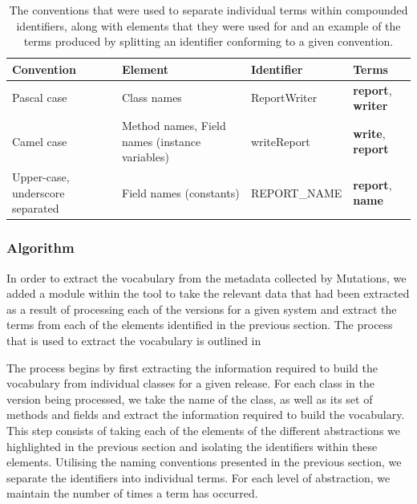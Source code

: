 \begin{table}[t]
\centering
\begin{tabular}{|p{}|p{}|p{}|p{}|}
\hline
{\bf Convention}&{\bf Element}&{\bf Identifier}&{\bf Terms} \\
\hline
\hline
Pascal case & Class names & ReportWriter & \textbf{report}, \textbf{writer} \\
\hline
Camel case & Method names, Field names (instance variables) & writeReport & \textbf{write}, \textbf{report} \\
\hline
Upper-case, underscore separated & Field names (constants) & REPORT\_NAME & \textbf{report}, \textbf{name} \\ 
\hline
\end{tabular}
\vspace{0.2cm}
\caption{The conventions that were used to separate individual terms within compounded identifiers, along with elements that they were used for and an example of the terms produced by splitting an identifier conforming to a given convention.}
\label{tab:splitting_conventions}
\end{table}


\subsubsection{Algorithm} %
\label{sub:algorithm}

In order to extract the vocabulary from the metadata collected by Mutations, we added a module within the tool to take the relevant data that had been extracted as a result of processing each of the versions for a given system and extract the terms from each of the elements identified in the previous section. The process that is used to extract the vocabulary is outlined in 

The process begins by first extracting the information required to build the vocabulary from individual classes for a given release. For each class in the version being processed, we take the name of the class, as well as its set of methods and fields and extract the information required to build the vocabulary. This step consists of taking each of the elements of the different abstractions we highlighted in the previous section and isolating the identifiers within these elements. Utilising the naming conventions presented in the previous section, we separate the identifiers into individual terms. For each level of abstraction, we maintain the number of times a term has occurred.

